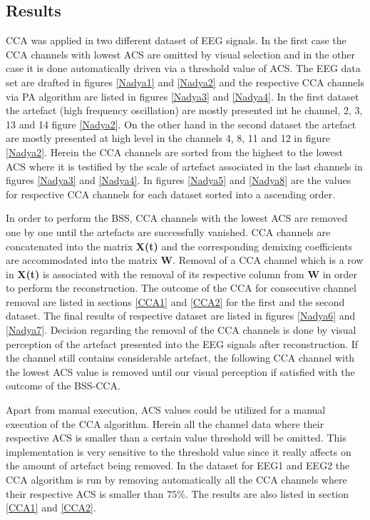 \subsection{Results}

CCA was applied in two different dataset of EEG signals. In the first case the CCA channels with lowest ACS are omitted by visual selection and in the other case it is done automatically driven via a threshold value of ACS. The EEG data set are drafted in figures \ref{Nadya1} and \ref{Nadya2} and the respective CCA channels via PA algorithm are listed in figures \ref{Nadya3} and \ref{Nadya4}.
In the first dataset the artefact (high frequency oscillation) are mostly presented int he channel, 2, 3, 13 and 14 figure \ref{Nadya2}. On the other hand in the second dataset the artefact are mostly presented at high level in the channels 4, 8, 11 and 12 in figure \ref{Nadya2}. Herein the CCA channels are sorted from the highest to the lowest ACS where it is testified by the scale of artefact associated in the last channels in figures \ref{Nadya3} and \ref{Nadya4}. In figures \ref{Nadya5} and \ref{Nadya8} are the values for respective CCA channels for each dataset sorted into a ascending order. 

 In order to perform the BSS, CCA channels with the lowest ACS are removed one by one until the artefacts are successfully vanished. CCA channels are concatenated into the matrix \textbf{X(t)} and the corresponding demixing coefficients are accommodated into the matrix \textbf{W}. Removal of a CCA channel which is a row in \textbf{X(t)} is associated with the removal of its respective column from \textbf{W} in order to perform the reconstruction. The outcome of the CCA for consecutive channel removal are listed in sections \ref{CCA1} and \ref{CCA2} for the first and the second dataset. The final results of respective dataset are listed in figures \ref{Nadya6} and \ref{Nadya7}. Decision regarding the removal of the CCA channels is done by visual perception of the artefact presented into the EEG signals after reconstruction. If the channel still contains considerable artefact, the following CCA channel with the lowest ACS value is removed until our visual perception if satisfied with the outcome of the BSS-CCA.

Apart from manual execution, ACS values could be utilized for a manual execution of the CCA algorithm. Herein all the channel data where their respective ACS is smaller than a certain value threshold will be omitted. This implementation is very sensitive to the threshold value since it really affects on the amount of artefact being removed. In the dataset for EEG1 and EEG2 the CCA algorithm is run by removing automatically all the CCA channels where their respective ACS is smaller than $75\%$. The results are also listed in section \ref{CCA1} and \ref{CCA2}.


